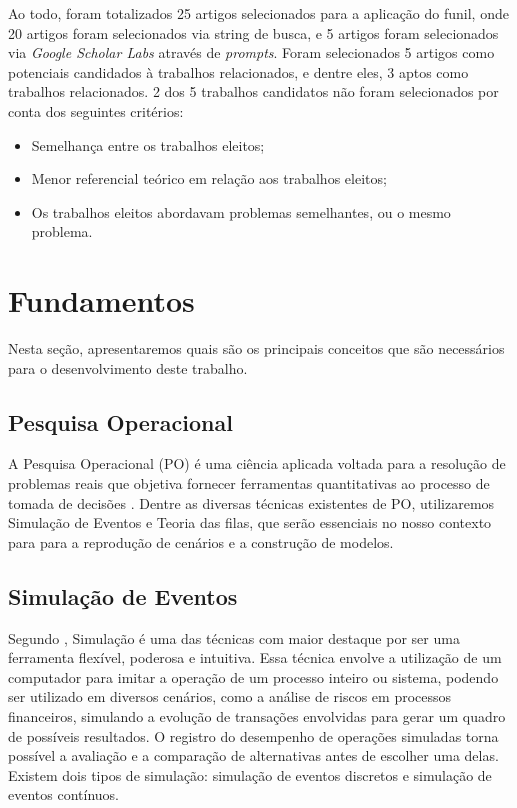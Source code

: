 \documentclass[
    12pt,                %
    openright,           %
    oneside,             %
    a4paper,             %
    english,             %
    brazil               %
]{abntex2}
\begin{document}
Ao todo, foram totalizados 25 artigos selecionados para a aplicação do funil, onde 20 artigos foram selecionados via string de busca, e 5 artigos foram selecionados via \textit{Google Scholar Labs} através de \textit{prompts}. Foram selecionados 5 artigos como potenciais candidados à trabalhos relacionados, e dentre eles, 3 aptos como trabalhos relacionados. 2 dos 5 trabalhos candidatos não foram selecionados por conta dos seguintes critérios:
\begin{itemize}
	\item Semelhança entre os trabalhos eleitos;
	\item Menor referencial teórico em relação aos trabalhos eleitos;
	\item Os trabalhos eleitos abordavam problemas semelhantes, ou o mesmo problema.
\end{itemize}

\section{Fundamentos}

Nesta seção, apresentaremos quais são os principais conceitos que são necessários para o desenvolvimento deste trabalho.

\subsection{Pesquisa Operacional}
A Pesquisa Operacional (PO) é uma ciência aplicada voltada para a resolução de problemas reais que objetiva fornecer ferramentas quantitativas ao processo de tomada de decisões \cite{Rodriguez2009}. Dentre as diversas técnicas existentes de PO, utilizaremos Simulação de Eventos e Teoria das filas, que serão essenciais no nosso contexto para para a reprodução de cenários e a construção de modelos.

\subsection{Simulação de Eventos}

Segundo , Simulação é uma das técnicas com maior destaque por ser uma ferramenta flexível, poderosa e intuitiva. Essa técnica envolve a utilização de um computador para imitar a operação de um processo inteiro ou sistema, podendo ser utilizado em diversos cenários, como a análise de riscos em processos financeiros, simulando a evolução de transações envolvidas para gerar um quadro de possíveis resultados. O registro do desempenho de operações simuladas torna possível  a avaliação e a comparação de alternativas antes de escolher uma delas. Existem dois tipos de simulação: simulação de eventos discretos e simulação de eventos contínuos.
\end{document}
